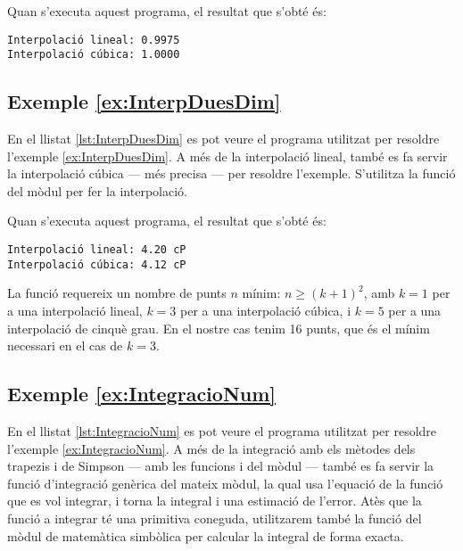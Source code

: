 Quan s'executa aquest programa, el resultat que s'obté és:
\lstset{
	language=,
	numbers=none,
	frame=none
}
\begin{lstlisting}
Interpolació lineal: 0.9975
Interpolació cúbica: 1.0000
\end{lstlisting} 


\hypertarget{exemple:InterpDuesDim}{\subsection{Exemple \ref*{ex:InterpDuesDim} \InterpDuesDim}}
En el llistat \vref{lst:InterpDuesDim} es pot veure el programa utilitzat per resoldre l'exemple \vref{ex:InterpDuesDim}. A més de la interpolació lineal, també es fa servir la interpolació cúbica --- més precisa --- per resoldre l'exemple. S'utilitza la funció  del mòdul  per fer la interpolació.


Quan s'executa aquest programa, el resultat que s'obté és:
\lstset{
	language=,
	numbers=none,
	frame=none
}
\begin{lstlisting}
Interpolació lineal: 4.20 cP
Interpolació cúbica: 4.12 cP
\end{lstlisting} 

La funció  requereix un nombre de punts $n$ mínim: $n \geq (k+1)^2$, amb $k=1$ per a una interpolació lineal, $k=3$ per a una interpolació cúbica, i $k=5$ per a una interpolació de cinquè grau. En el nostre cas tenim 16 punts, que és el mínim necessari en el cas de $k=3$.

\hypertarget{exemple:IntegracioNum}{\subsection{Exemple \ref*{ex:IntegracioNum} \IntegracioNum}}
En el llistat \vref{lst:IntegracioNum} es pot veure el programa utilitzat per resoldre l'exemple \vref{ex:IntegracioNum}. A més de la integració amb els  mètodes dels trapezis i de Simpson --- amb les funcions  i  del mòdul  --- també es fa servir la funció  d'integració genèrica  del mateix mòdul,  la qual usa l'equació de la funció que es vol integrar, i torna la integral i una estimació de l'error. Atès que la funció a integrar té una primitiva coneguda, utilitzarem també la funció  del mòdul de matemàtica simbòlica  per calcular la integral de forma exacta.


